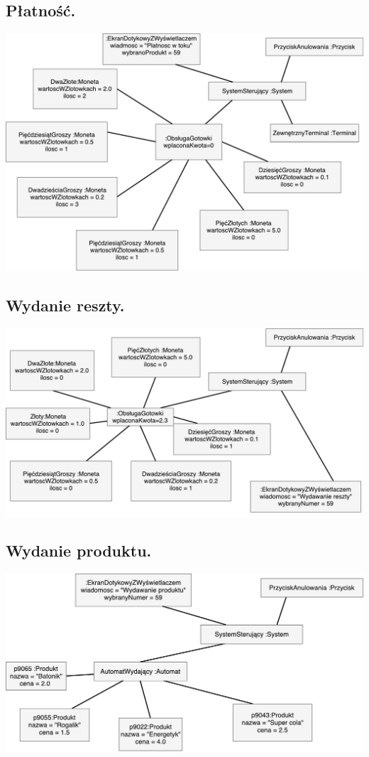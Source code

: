 \documentclass[11pt]{article}
\begin{document}
		\subsection{Płatność.}
		\begin{center}
			\includegraphics[scale=0.65]{obiektow2.pdf}
		\end{center}
		\subsection{Wydanie reszty.}
		\begin{center}
			\includegraphics[scale=0.65]{obiektow3.pdf}
		\end{center}
		\subsection{Wydanie produktu.}
		\begin{center}
			\includegraphics[scale=0.65]{obiektow4.pdf}
		\end{center}
\end{document}
